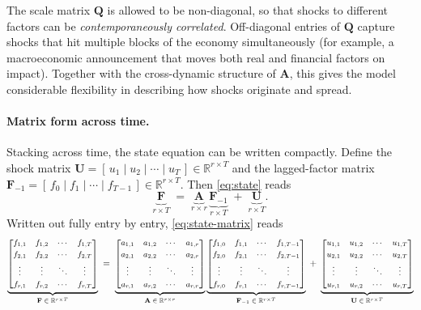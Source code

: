 \documentclass[11pt, a4paper, oneside]{article}
\newcommand{\mF}{\mathbf{F}}
\newcommand{\mA}{\mathbf{A}}
\begin{document}
The scale matrix $\mathbf{Q}$ is allowed to be non-diagonal, so that
shocks to different factors can be \emph{contemporaneously correlated}.
Off-diagonal entries of $\mathbf{Q}$ capture shocks that hit multiple
blocks of the economy simultaneously (for example, a macroeconomic
announcement that moves both real and financial factors on impact).
Together with the cross-dynamic structure of $\mathbf{A}$, this gives
the model considerable flexibility in describing how shocks originate
and spread.

\paragraph{Matrix form across time.}
Stacking across time, the state equation can be written compactly.
Define the shock matrix
$\mathbf{U} = [\,u_1 \mid u_2 \mid \cdots \mid u_T\,] \in \mathbb{R}^{r \times T}$
and the lagged-factor matrix
$\mF_{-1} = [\,f_0 \mid f_1 \mid \cdots \mid f_{T-1}\,] \in \mathbb{R}^{r \times T}$.
Then \eqref{eq:state} reads
\begin{equation}
\underbrace{\mF}_{r \times T} \;=\; \underbrace{\mA}_{r \times r}\, \underbrace{\mF_{-1}}_{r \times T} \;+\; \underbrace{\mathbf{U}}_{r \times T}.
\label{eq:state-matrix}
\end{equation}
Written out fully entry by entry, \eqref{eq:state-matrix} reads
\[
{\small
\underbrace{\begin{bmatrix}
    f_{1,1} & f_{1,2} & \cdots & f_{1,T} \\[2pt]
    f_{2,1} & f_{2,2} & \cdots & f_{2,T} \\[2pt]
    \vdots  & \vdots  & \ddots & \vdots  \\[2pt]
    f_{r,1} & f_{r,2} & \cdots & f_{r,T}
\end{bmatrix}}_{\mF \;\in\; \mathbb{R}^{r \times T}}
\;=\;
\underbrace{\begin{bmatrix}
    a_{1,1} & a_{1,2} & \cdots & a_{1,r} \\[2pt]
    a_{2,1} & a_{2,2} & \cdots & a_{2,r} \\[2pt]
    \vdots  & \vdots  & \ddots & \vdots  \\[2pt]
    a_{r,1} & a_{r,2} & \cdots & a_{r,r}
\end{bmatrix}}_{\mA \;\in\; \mathbb{R}^{r \times r}}
\underbrace{\begin{bmatrix}
    f_{1,0} & f_{1,1} & \cdots & f_{1,T-1} \\[2pt]
    f_{2,0} & f_{2,1} & \cdots & f_{2,T-1} \\[2pt]
    \vdots  & \vdots  & \ddots & \vdots    \\[2pt]
    f_{r,0} & f_{r,1} & \cdots & f_{r,T-1}
\end{bmatrix}}_{\mF_{-1} \;\in\; \mathbb{R}^{r \times T}}
\;+\;
\underbrace{\begin{bmatrix}
    u_{1,1} & u_{1,2} & \cdots & u_{1,T} \\[2pt]
    u_{2,1} & u_{2,2} & \cdots & u_{2,T} \\[2pt]
    \vdots  & \vdots  & \ddots & \vdots  \\[2pt]
    u_{r,1} & u_{r,2} & \cdots & u_{r,T}
\end{bmatrix}}_{\mathbf{U} \;\in\; \mathbb{R}^{r \times T}}
}
\]
\end{document}
